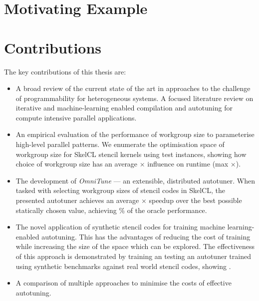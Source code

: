 

\section{Motivating Example}



\section{Contributions}

The key contributions of this thesis are:

\begin{itemize}
\item A broad review of the current state of the art in approaches to
  the challenge of programmability for heterogeneous systems. A
  focused literature review on iterative and machine-learning enabled
  compilation and autotuning for compute intensive parallel
  applications.
\item An empirical evaluation of the performance of workgroup size to
  parameterise high-level parallel patterns. We enumerate the
  optimisation space of workgroup size for SkelCL stencil kernels
  using  test instances, showing how
  choice of workgroup size has an average
  $\times$ influence on runtime (max
  $\times$).
\item The development of \emph{OmniTune} --- an extensible,
  distributed autotuner. When tasked with selecting workgroup sizes of
  stencil codes in SkelCL, the presented autotuner achieves an average
  $\times$ speedup over the best possible statically chosen
  value, achieving \% of the oracle performance.
\item The novel application of synthetic  stencil codes for training machine learning-enabled
  autotuning. This has the advantages of reducing the cost of training
  while increasing the size of the space which can be explored. The
  effectiveness of this approach is demonstrated by training an
  testing an autotuner trained using synthetic benchmarks against
   real world stencil codes, showing
  .
\item A comparison of multiple approaches to minimise the costs of
  effective autotuning. 
\end{itemize}

